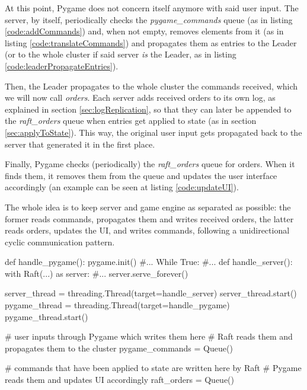 At this point, Pygame does not concern itself anymore with said user input. The server, by itself, periodically checks the \textit{pygame\_commands} queue (as in listing \ref{code:addCommands}) and, when not empty, removes elements from it (as in listing \ref{code:translateCommands}) and propagates them as entries to the Leader (or to the whole cluster if said server \textit{is} the Leader, as in listing \ref{code:leaderPropagateEntries}).

Then, the Leader propagates to the whole cluster the commands received, which we will now call \textit{orders}. Each server adds received orders to its own log, as explained in section \ref{sec:logReplication}, so that they can later be appended to the \textit{raft\_orders} queue when entries get applied to state (as in section \ref{sec:applyToState}). This way, the original user input gets propagated back to the server that generated it in the first place.

Finally, Pygame checks (periodically) the \textit{raft\_orders} queue for orders. When it finds them, it removes them from the queue and updates the user interface accordingly (an example can be seen at listing \ref{code:updateUI}).

The whole idea is to keep server and game engine as separated as possible: the former reads commands, propagates them and writes received orders, the latter reads orders, updates the UI, and writes commands, following a unidirectional cyclic communication pattern.

\begin{python}[label={code:startMainThreads}, caption={Start both Pygame and server's threads}]
def handle_pygame():
    pygame.init()
    #...
    While True:
         #...
def handle_server():
    with Raft(...) as server:
        #...
        server.serve_forever()

server_thread = threading.Thread(target=handle_server)
server_thread.start()
pygame_thread = threading.Thread(target=handle_pygame)
pygame_thread.start()
\end{python}

\begin{python}[label={code:queues}, caption={Queues for commands and orders, they allow inter-thread communication}]
# user inputs through Pygame which writes them here
# Raft reads them and propagates them to the cluster
pygame_commands = Queue()

# commands that have been applied to state are written here by Raft
# Pygame reads them and updates UI accordingly 
raft_orders = Queue()
\end{python}

